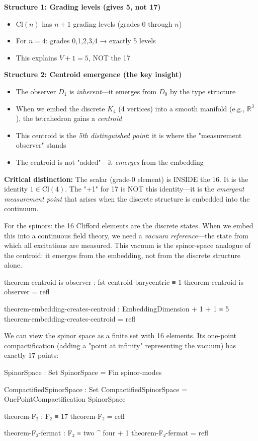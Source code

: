 \documentclass[11pt,a4paper]{book}
\begin{document}
\textbf{Structure 1: Grading levels (gives 5, not 17)}
\begin{itemize}
\item $\text{Cl}(n)$ has $n+1$ grading levels (grades 0 through $n$)
\item For $n=4$: grades 0,1,2,3,4 → exactly 5 levels
\item This explains $V + 1 = 5$, NOT the 17
\end{itemize}

\textbf{Structure 2: Centroid emergence (the key insight)}
\begin{itemize}
\item The observer $D_1$ is \emph{inherent}---it emerges from $D_0$ by the type structure
\item When we embed the discrete $K_4$ (4 vertices) into a smooth manifold (e.g., $\mathbb{R}^3$), 
      the tetrahedron gains a \emph{centroid}
\item This centroid is the \emph{5th distinguished point}: it is where the "measurement observer" stands
\item The centroid is not "added"---it \emph{emerges} from the embedding
\end{itemize}

\textbf{Critical distinction:} The scalar (grade-0 element) is INSIDE the 16. It is the 
identity $1 \in \text{Cl}(4)$. The "+1" for 17 is NOT this identity---it is the 
\emph{emergent measurement point} that arises when the discrete structure is embedded 
into the continuum.

For the spinors: the 16 Clifford elements are the discrete states. When we embed this 
into a continuous field theory, we need a \emph{vacuum reference}---the state from which 
all excitations are measured. This vacuum is the spinor-space analogue of the centroid:
it emerges from the embedding, not from the discrete structure alone.

\begin{code}
theorem-centroid-is-observer : fst centroid-barycentric ≡ 1
theorem-centroid-is-observer = refl

theorem-embedding-creates-centroid : EmbeddingDimension + 1 + 1 ≡ 5
theorem-embedding-creates-centroid = refl
\end{code}

We can view the spinor space as a finite set with 16 elements. Its one-point compactification 
(adding a "point at infinity" representing the vacuum) has exactly 17 points:

\begin{code}
SpinorSpace : Set
SpinorSpace = Fin spinor-modes

CompactifiedSpinorSpace : Set
CompactifiedSpinorSpace = OnePointCompactification SpinorSpace

theorem-F₂ : F₂ ≡ 17
theorem-F₂ = refl

theorem-F₂-fermat : F₂ ≡ two ^ four + 1
theorem-F₂-fermat = refl
\end{code}
\end{document}

